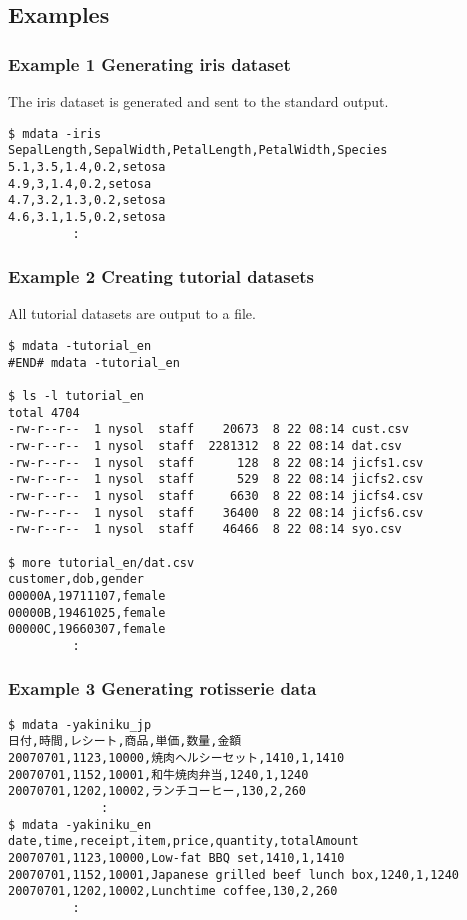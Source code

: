 \subsection*{Examples}
\subsubsection*{Example 1 Generating iris dataset}
The iris dataset is generated and sent to the standard output.

\begin{Verbatim}[baselinestretch=0.7,frame=single,fontsize=\small]
$ mdata -iris
SepalLength,SepalWidth,PetalLength,PetalWidth,Species
5.1,3.5,1.4,0.2,setosa
4.9,3,1.4,0.2,setosa
4.7,3.2,1.3,0.2,setosa
4.6,3.1,1.5,0.2,setosa
         :
\end{Verbatim}

\subsubsection*{Example 2 Creating tutorial datasets}
All tutorial datasets are output to a file.

\begin{Verbatim}[baselinestretch=0.7,frame=single,fontsize=\small]
$ mdata -tutorial_en
#END# mdata -tutorial_en

$ ls -l tutorial_en
total 4704
-rw-r--r--  1 nysol  staff    20673  8 22 08:14 cust.csv
-rw-r--r--  1 nysol  staff  2281312  8 22 08:14 dat.csv
-rw-r--r--  1 nysol  staff      128  8 22 08:14 jicfs1.csv
-rw-r--r--  1 nysol  staff      529  8 22 08:14 jicfs2.csv
-rw-r--r--  1 nysol  staff     6630  8 22 08:14 jicfs4.csv
-rw-r--r--  1 nysol  staff    36400  8 22 08:14 jicfs6.csv
-rw-r--r--  1 nysol  staff    46466  8 22 08:14 syo.csv

$ more tutorial_en/dat.csv
customer,dob,gender
00000A,19711107,female
00000B,19461025,female
00000C,19660307,female
         :
\end{Verbatim}

\subsubsection*{Example 3 Generating rotisserie data}

\begin{Verbatim}[baselinestretch=0.7,frame=single,fontsize=\small]
$ mdata -yakiniku_jp
日付,時間,レシート,商品,単価,数量,金額
20070701,1123,10000,焼肉ヘルシーセット,1410,1,1410
20070701,1152,10001,和牛焼肉弁当,1240,1,1240
20070701,1202,10002,ランチコーヒー,130,2,260
             :
$ mdata -yakiniku_en
date,time,receipt,item,price,quantity,totalAmount
20070701,1123,10000,Low-fat BBQ set,1410,1,1410
20070701,1152,10001,Japanese grilled beef lunch box,1240,1,1240
20070701,1202,10002,Lunchtime coffee,130,2,260
         :
\end{Verbatim}

%
